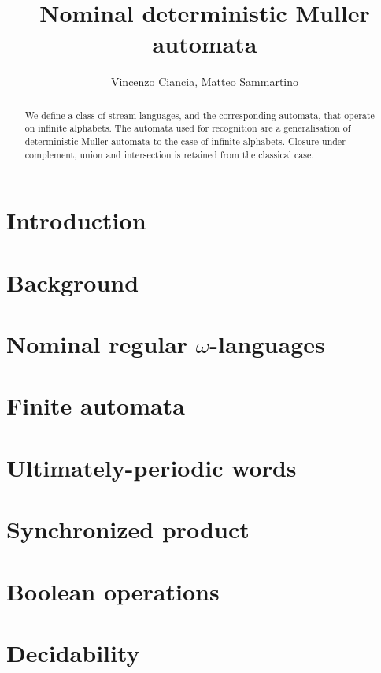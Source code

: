 \documentclass[orivec]{llncs}
\title{Nominal deterministic Muller automata}
\author{Vincenzo Ciancia, Matteo Sammartino}
\institute{}
\begin{document}
\maketitle

\begin{abstract}
 We define a class of stream languages, and the corresponding automata, that operate on infinite alphabets. The automata used for recognition are a generalisation of deterministic Muller automata to the case of infinite alphabets. Closure under complement, union and intersection is retained from the classical case.
\end{abstract}

\section{Introduction}\label{sec:introduction}

\section{Background}\label{sec:background}

\section{Nominal regular $\omega$-languages}\label{sec:languages}


\section{Finite automata}\label{sec:hd-automata}



\section{Ultimately-periodic words}\label{sec:up-determinacy}

\section{Synchronized product}\label{sec:sync-product}


\section{Boolean operations}\label{sec:boolean-operations}


\section{Decidability}\label{sec:decidability}



\end{document}
